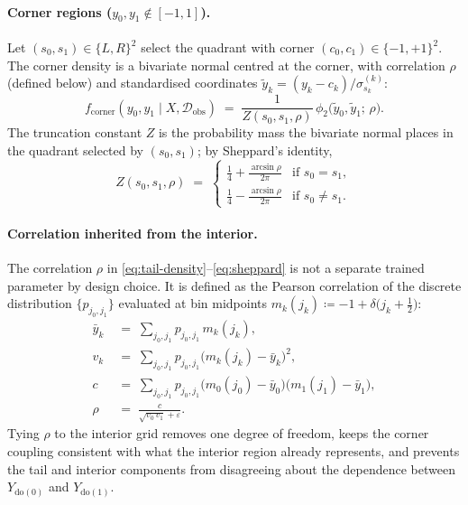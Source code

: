 \documentclass[11pt]{article}
\begin{document}
\paragraph{Corner regions ($y_{0}, y_{1} \notin [-1, 1]$).}
Let $(s_{0}, s_{1}) \in \{L, R\}^{2}$ select the quadrant with corner
$(c_{0}, c_{1}) \in \{-1, +1\}^{2}$. The corner density is a bivariate
normal centred at the corner, with correlation $\rho$ (defined below)
and standardised coordinates $\tilde{y}_{k} = (y_{k} - c_{k}) / \sigma_{s_{k}}^{(k)}$:
\begin{equation}
  f_{\mathrm{corner}}(y_{0}, y_{1} \mid X, \mathcal{D}_{\mathrm{obs}})
  \;=\;
  \frac{1}{Z(s_{0}, s_{1}, \rho)}\,
  \phi_{2}\!\bigl(\tilde{y}_{0}, \tilde{y}_{1};\, \rho\bigr).
  \label{eq:tail-density}
\end{equation}
The truncation constant $Z$ is the probability mass the bivariate normal
places in the quadrant selected by $(s_{0}, s_{1})$; by Sheppard's
identity,
\begin{equation}
  Z(s_{0}, s_{1}, \rho)
  \;=\;
  \begin{cases}
    \tfrac{1}{4} + \tfrac{\arcsin \rho}{2\pi}
      & \text{if } s_{0} = s_{1}, \\[4pt]
    \tfrac{1}{4} - \tfrac{\arcsin \rho}{2\pi}
      & \text{if } s_{0} \neq s_{1}.
  \end{cases}
  \label{eq:sheppard}
\end{equation}

\paragraph{Correlation inherited from the interior.}
The correlation $\rho$ in \eqref{eq:tail-density}--\eqref{eq:sheppard}
is not a separate trained parameter by design choice. It is defined as the Pearson correlation of the discrete distribution $\{p_{j_{0}, j_{1}}\}$ evaluated at bin midpoints
$m_{k}(j_{k}) \coloneqq -1 + \delta\bigl(j_{k} + \tfrac{1}{2}\bigr)$:
\begin{equation}
\begin{aligned}
\bar{y}_{k}
  \;&=\; \sum_{j_{0}, j_{1}} p_{j_{0}, j_{1}}\, m_{k}(j_{k}), \\
v_{k}
  \;&=\; \sum_{j_{0}, j_{1}} p_{j_{0}, j_{1}}
         \bigl(m_{k}(j_{k}) - \bar{y}_{k}\bigr)^{2}, \\
c
  \;&=\; \sum_{j_{0}, j_{1}} p_{j_{0}, j_{1}}
         \bigl(m_{0}(j_{0}) - \bar{y}_{0}\bigr)
         \bigl(m_{1}(j_{1}) - \bar{y}_{1}\bigr), \\
\rho
  \;&=\; \frac{c}{\sqrt{v_{0}\, v_{1}} + \varepsilon}.
\end{aligned}
\label{eq:rho-derived}
\end{equation}
Tying $\rho$ to the interior grid removes one degree of freedom, keeps
the corner coupling consistent with what the interior region already
represents, and prevents the tail and interior components from
disagreeing about the dependence between $Y_{\mathrm{do}(0)}$ and
$Y_{\mathrm{do}(1)}$.
\end{document}
